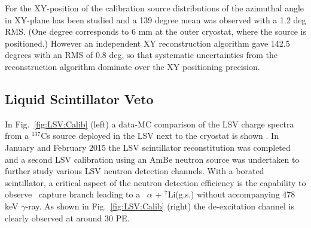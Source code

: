 For the XY-position of the calibration source distributions of the azimuthal angle in XY-plane has been studied and a 139 degree mean was observed with a 1.2 deg RMS. (One degree corresponds to 6 mm at the outer cryostat, where the source is positioned.) However an independent XY reconstruction algorithm gave 142.5 degrees with an RMS of 0.8 deg, so that systematic uncertainties from the reconstruction algorithm dominate over the XY positioning precision. %



\subsection{Liquid Scintillator Veto}\label{sec:LSV:gammasources}

In Fig.~\ref{fig:LSV:Calib} (left) a data-MC comparison of the LSV charge spectra from a $^{137}$Cs source deployed in the LSV next to the cryostat is shown \cite{DS50:G4DS:paper}.
In January and February 2015 the LSV scintillator reconstitution was completed and a second LSV calibration using an AmBe neutron source was undertaken to further study various LSV neutron detection channels. With a borated scintillator, a critical aspect of the neutron detection efficiency is the capability to observe \brbortenground\ capture branch leading to a \enbortengroundalpha\ $\alpha$ + $^7$Li(g.s.) without accompanying 478 keV $\gamma$-ray. As shown in Fig.~\ref{fig:LSV:Calib} (right) the de-excitation channel is clearly observed at around 30 PE.

